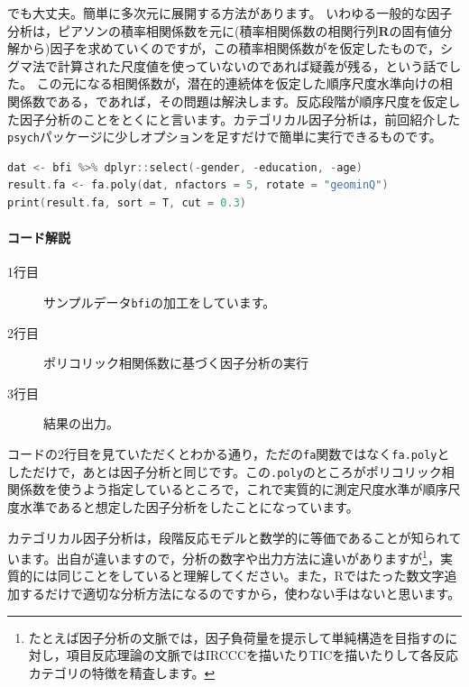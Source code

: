 \documentclass{ltjsbook}
\begin{document}
でも大丈夫。簡単に多次元に展開する方法があります。
いわゆる一般的な因子分析は，ピアソンの積率相関係数を元に(積率相関係数の相関行列$\bm{R}$の固有値分解から)因子を求めていくのですが，この積率相関係数がを仮定したもので，シグマ法で計算された尺度値を使っていないのであれば疑義が残る，という話でした。
この元になる相関係数が，潜在的連続体を仮定した順序尺度水準向けの相関係数である，であれば，その問題は解決します。反応段階が順序尺度を仮定した因子分析のことをとくにと言います。カテゴリカル因子分析は，前回紹介した\texttt{psych}パッケージに少しオプションを足すだけで簡単に実行できるものです。

\begin{lstlisting}[language=c++,label={code:11_06},caption={カテゴリカル因子分析の実行}]
dat <- bfi %>% dplyr::select(-gender, -education, -age)
result.fa <- fa.poly(dat, nfactors = 5, rotate = "geominQ")
print(result.fa, sort = T, cut = 0.3)
\end{lstlisting}

\paragraph{コード解説}
\begin{description}
	\item[1行目] サンプルデータ\texttt{bfi}の加工をしています。
	\item[2行目] ポリコリック相関係数に基づく因子分析の実行
	\item[3行目] 結果の出力。
\end{description}

コードの2行目を見ていただくとわかる通り，ただの\texttt{fa}関数ではなく\texttt{fa.poly}としただけで，あとは因子分析と同じです。この\texttt{.poly}のところがポリコリック相関係数を使うよう指定しているところで，これで実質的に測定尺度水準が順序尺度水準であると想定した因子分析をしたことになっています。

カテゴリカル因子分析は，段階反応モデルと数学的に等価であることが知られています。出自が違いますので，分析の数字や出力方法に違いがありますが\footnote{たとえば因子分析の文脈では，因子負荷量を提示して単純構造を目指すのに対し，項目反応理論の文脈ではIRCCCを描いたりTICを描いたりして各反応カテゴリの特徴を精査します。}，実質的には同じことをしていると理解してください。また，Rではたった数文字追加するだけで適切な分析方法になるのですから，使わない手はないと思います。
\end{document}
